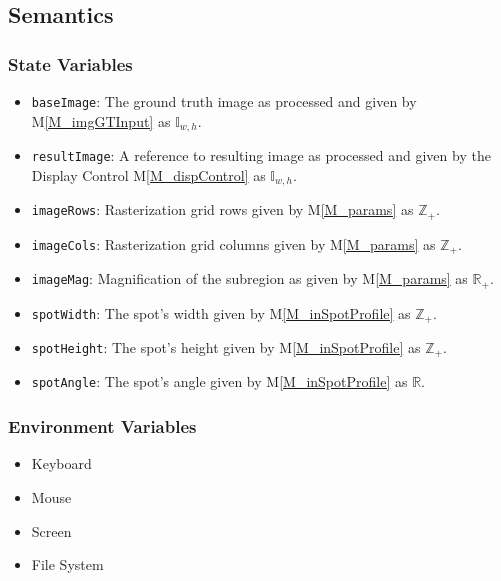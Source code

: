 \documentclass[12pt, titlepage]{article}
\newcommand{\mref}[1]{M\ref{#1}}
\newcommand{\code}[1]{\texttt{#1}}
\begin{document}
\subsection{Semantics}

\subsubsection{State Variables}
\begin{itemize}
  \item \code{baseImage}: The ground truth image as processed and given by \mref{M_imgGTInput} as $\mathbb{I}_{w,h}$.
  \item \code{resultImage}: A reference to resulting image as processed and given by the Display Control \mref{M_dispControl} as $\mathbb{I}_{w,h}$.
  \item \code{imageRows}: Rasterization grid rows given by \mref{M_params} as $\mathbb{Z}_+$.
  \item \code{imageCols}: Rasterization grid columns given by \mref{M_params} as $\mathbb{Z}_+$.
  \item \code{imageMag}: Magnification of the subregion as given by \mref{M_params} as $\mathbb{R}_+$.
  \item \code{spotWidth}: The spot's width given by \mref{M_inSpotProfile} as $\mathbb{Z}_+$.
  \item \code{spotHeight}: The spot's height given by \mref{M_inSpotProfile} as $\mathbb{Z}_+$.
  \item \code{spotAngle}: The spot's angle given by \mref{M_inSpotProfile} as $\mathbb{R}$.
\end{itemize}

\subsubsection{Environment Variables}
\begin{itemize}
  \item Keyboard
  \item Mouse
  \item Screen
  \item File System
\end{itemize}
\end{document}
